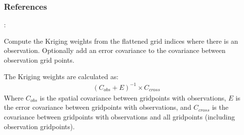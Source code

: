 \documentclass[letterpaper,10pt,english]{sphinxmanual}
\begin{document}
\begin{fulllineitems}
\begin{fulllineitems}
\begin{quote}
\begin{description}
\end{description}\end{quote}
\subsubsection*{References}

\sphinxAtStartPar
{}: 

\end{fulllineitems}


\begin{fulllineitems}
\label{\detokenize{kriging:glomar_gridding.kriging.SimpleKriging.get_kriging_weights}}
\pysigstartsignatures
\pysiglinewithargsret
{}
{\sphinxparamcomma {}}
{}
\pysigstopsignatures
\sphinxAtStartPar
Compute the Kriging weights from the flattened grid indices where
there is an observation. Optionally add an error covariance to the
covariance between observation grid points.

\sphinxAtStartPar
The Kriging weights are calculated as:
\begin{equation*}
\begin{split}(C_{obs} + E)^{-1} \times C_{cross}\end{split}
\end{equation*}
\sphinxAtStartPar
Where \(C_{obs}\) is the spatial covariance between grid\sphinxhyphen{}points
with observations, \(E\) is the error covariance between grid\sphinxhyphen{}points
with observations, and \(C_{cross}\) is the covariance between
grid\sphinxhyphen{}points with observations and all grid\sphinxhyphen{}points (including observation
grid\sphinxhyphen{}points).


\end{fulllineitems}
\end{fulllineitems}
\end{document}
